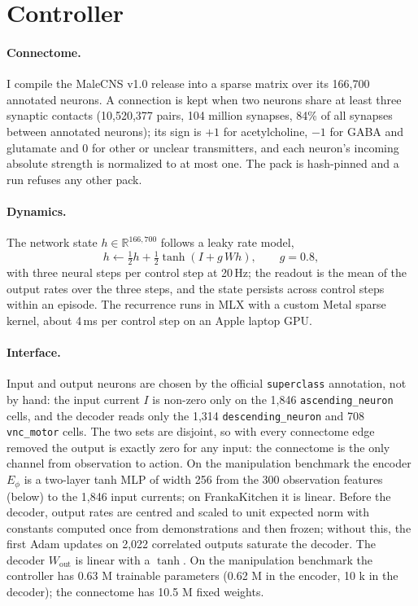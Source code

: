 \documentclass[10pt,twocolumn]{article}
\begin{document}
\section{Controller}
\label{sec:method}

\paragraph{Connectome.}
I compile the MaleCNS v1.0 release into a sparse matrix over its 166,700 annotated neurons.
A connection is kept when two neurons share at least three synaptic contacts (10,520,377 pairs, 104 million synapses, 84\% of all synapses between annotated neurons); its sign is $+1$ for acetylcholine, $-1$ for GABA and glutamate and $0$ for other or unclear transmitters, and each neuron's incoming absolute strength is normalized to at most one.
The pack is hash-pinned and a run refuses any other pack.

\paragraph{Dynamics.}
The network state $h \in \mathbb{R}^{166{,}700}$ follows a leaky rate model,
\begin{equation}
h \leftarrow \tfrac{1}{2} h + \tfrac{1}{2}\tanh\!\left(I + g\,W h\right), \qquad g = 0.8,
\end{equation}
with three neural steps per control step at 20\,Hz; the readout is the mean of the output rates over the three steps, and the state persists across control steps within an episode.
The recurrence runs in MLX \citep{mlx2023} with a custom Metal sparse kernel, about 4\,ms per control step on an Apple laptop GPU.

\paragraph{Interface.}
Input and output neurons are chosen by the official \texttt{superclass} annotation, not by hand: the input current $I$ is non-zero only on the 1,846 \texttt{ascending\_neuron} cells, and the decoder reads only the 1,314 \texttt{descending\_neuron} and 708 \texttt{vnc\_motor} cells.
The two sets are disjoint, so with every connectome edge removed the output is exactly zero for any input: the connectome is the only channel from observation to action.
On the manipulation benchmark the encoder $E_\phi$ is a two-layer tanh MLP of width 256 from the 300 observation features (below) to the 1,846 input currents; on FrankaKitchen it is linear.
Before the decoder, output rates are centred and scaled to unit expected norm with constants computed once from demonstrations and then frozen; without this, the first Adam updates on 2,022 correlated outputs saturate the decoder.
The decoder $W_{\mathrm{out}}$ is linear with a $\tanh$.
On the manipulation benchmark the controller has 0.63 M trainable parameters (0.62 M in the encoder, 10 k in the decoder); the connectome has 10.5 M fixed weights.
\end{document}
